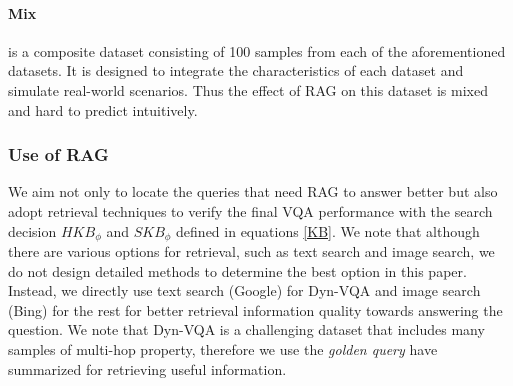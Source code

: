 \paragraph{Mix} is a composite dataset consisting of 100 samples from each of the aforementioned datasets. It is designed to integrate the characteristics of each dataset and simulate real-world scenarios. Thus the effect of RAG on this dataset is mixed and hard to predict intuitively.




\begin{table}[t]
\centering
\small
\caption{Test data property illustration that whether RAG is helpful in answering the queries.}
\label{test_set_table}
\end{table}



\subsubsection{Use of RAG} We aim not only to locate the queries that need RAG to answer better but also adopt retrieval techniques to verify the final VQA performance with the search decision $HKB_\phi$ and $SKB_\phi$ defined in equations \ref{KB}. We note that although there are various options for retrieval, such as text search and image search, we do not design detailed methods to determine the best option in this paper. Instead, we directly use text search (Google) for Dyn-VQA and image search (Bing) for the rest for better retrieval information quality towards answering the question. We note that Dyn-VQA is a challenging dataset that includes many samples of multi-hop property, therefore we use the \textit{golden query} \citet{li2024benchmarkingmultimodalretrievalaugmented} have summarized for retrieving useful information.

